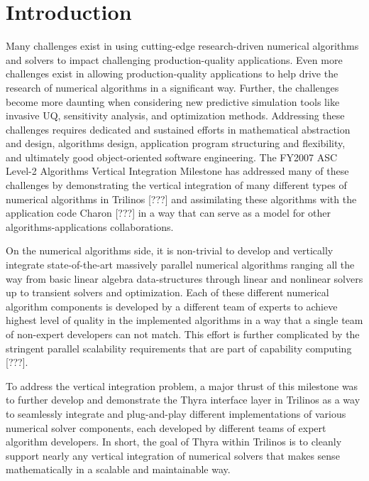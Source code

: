 \documentclass[pdf,ps2pdf,11pt]{SANDreport}
\begin{document}
\section{Introduction}
%

Many challenges exist in using cutting-edge research-driven numerical
algorithms and solvers to impact challenging production-quality applications.
Even more challenges exist in allowing production-quality applications to help
drive the research of numerical algorithms in a significant way.  Further, the
challenges become more daunting when considering new predictive simulation
tools like invasive UQ, sensitivity analysis, and optimization methods.
Addressing these challenges requires dedicated and sustained efforts in
mathematical abstraction and design, algorithms design, application program
structuring and flexibility, and ultimately good object-oriented software
engineering.  The FY2007 ASC Level-2 Algorithms Vertical Integration Milestone has
addressed many of these challenges by demonstrating the vertical integration
of many different types of numerical algorithms in Trilinos [???] and
assimilating these algorithms with the application code Charon [???] in a way
that can serve as a model for other algorithms-applications collaborations.

On the numerical algorithms side, it is non-trivial to develop and vertically
integrate state-of-the-art massively parallel numerical algorithms ranging all
the way from basic linear algebra data-structures through linear and nonlinear
solvers up to transient solvers and optimization.  Each of these different
numerical algorithm components is developed by a different team of experts to
achieve highest level of quality in the implemented algorithms in a way that a
single team of non-expert developers can not match.  This effort is further
complicated by the stringent parallel scalability requirements that are part
of capability computing [???].

To address the vertical integration problem, a major thrust of this milestone
was to further develop and demonstrate the Thyra interface layer in Trilinos
as a way to seamlessly integrate and plug-and-play different implementations of
various numerical solver components, each developed by different teams of
expert algorithm developers.  In short, the goal of Thyra within Trilinos is
to cleanly support nearly any vertical integration of numerical solvers that
makes sense mathematically in a scalable and maintainable way.
\end{document}
